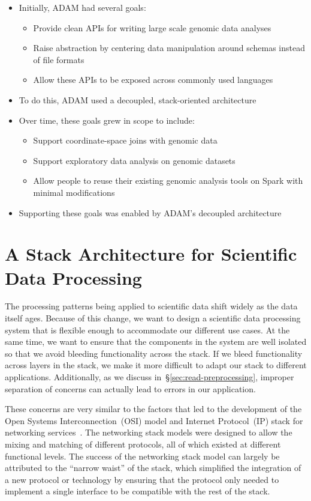 \documentclass[phd]{ucbthesis}
\begin{document}
\begin{itemize}
\item Initially, \textsc{ADAM} had several goals:
  \begin{itemize}
  \item Provide clean APIs for writing large scale genomic data analyses
  \item Raise abstraction by centering data manipulation around schemas instead
    of file formats
  \item Allow these APIs to be exposed across commonly used languages
  \end{itemize}
\item To do this, \textsc{ADAM} used a decoupled, stack-oriented architecture
\item Over time, these goals grew in scope to include:
  \begin{itemize}
  \item Support coordinate-space joins with genomic data
  \item Support exploratory data analysis on genomic datasets
  \item Allow people to reuse their existing genomic analysis tools on Spark with
    minimal modifications
  \end{itemize}
\item Supporting these goals was enabled by \textsc{ADAM}'s decoupled architecture
\end{itemize}

\section{A Stack Architecture for Scientific Data Processing}
\label{sec:stack-architecture}

The processing patterns being applied to scientific data shift widely as the data itself ages. Because of
this change, we want to design a scientific data processing system that is flexible enough to
accommodate our different use cases. At the same time, we want to ensure that the components in the
system are well isolated so that we avoid bleeding functionality across the stack. If we bleed functionality
across layers in the stack, we make it more difficult to adapt our stack to different applications.
Additionally, as we discuss in~\S\ref{sec:read-preprocessing}, improper separation of concerns can
actually lead to errors in our application.

These concerns are very similar to the factors that led to the development of the Open Systems
Interconnection~(OSI) model and Internet Protocol~(IP) stack for networking
services~\cite{zimmermann80}. The networking stack models were designed to allow the mixing and
matching of different protocols, all of which existed at different functional levels. The success of the
networking stack model can largely be attributed to the ``narrow waist'' of the stack, which simplified the
integration of a new protocol or technology by ensuring that the protocol only needed to implement a
single interface to be compatible with the rest of the stack.
\end{document}
